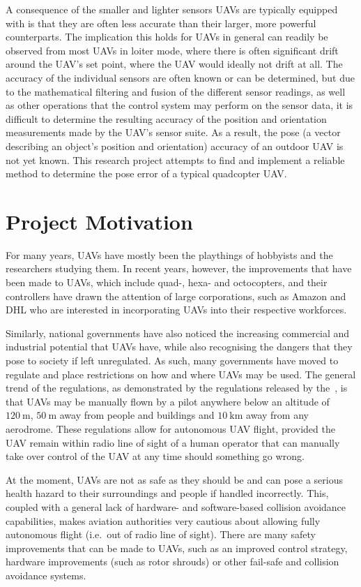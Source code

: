 A consequence of the smaller and lighter sensors UAVs are typically equipp\-ed with is that they are often less accurate than their larger, more powerful counterparts. The implication this holds for UAVs in general can readily be observed from most UAVs in loiter mode, where there is often significant drift around the UAV's set point, where the UAV would ideally not drift at all. The accuracy of the individual sensors are often known or can be determined, but due to the mathematical filtering and fusion of the different sensor readings, as well as other operations that the control system may perform on the sensor data, it is difficult to determine the resulting accuracy of the position and orientation measurements made by the UAV's sensor suite. As a result, the pose (a vector describing an object's position and orientation) accuracy of an outdoor UAV is not yet known. This research project attempts to find and implement a reliable method to determine the pose error of a typical quadcopter UAV.\@  

\section{Project Motivation}

For many years, UAVs have mostly been the playthings of hobbyists and the researchers studying them. In recent years, however, the improvements that have been made to UAVs, which include quad-, hexa- and octocopters, and their controllers have drawn the attention of large corporations, such as Amazon and DHL who are interested in incorporating UAVs into their respective workforces. 

Similarly, national governments have also noticed the increasing commercial and industrial potential that UAVs have, while also recognising the dangers that they pose to society if left unregulated. As such, many governments have moved to regulate and place restrictions on how and where UAVs may be used. The general trend of the regulations, as demonstrated by the regulations released by the~\cite{sacaa-drone-regs}, is that UAVs may be manually flown by a pilot anywhere below an altitude of $\SI{120}{\m}$, $\SI{50}{\m}$ away from people and buildings and $\SI{10}{\km}$ away from any aerodrome. These regulations allow for autonomous UAV flight, provided the UAV remain within radio line of sight of a human operator that can manually take over control of the UAV at any time should something go wrong. 

At the moment, UAVs are not as safe as they should be and can pose a serious health hazard to their surroundings and people if handled incorrectly. This, coupled with a general lack of hardware- and software-based collision avoidance capabilities, makes aviation authorities very cautious about allowing fully autonomous flight (i.e.\ out of radio line of sight). There are many safety improvements that can be made to UAVs, such as an improved control strategy, hardware improvements (such as rotor shrouds) or other fail-safe and collision avoidance systems. 

